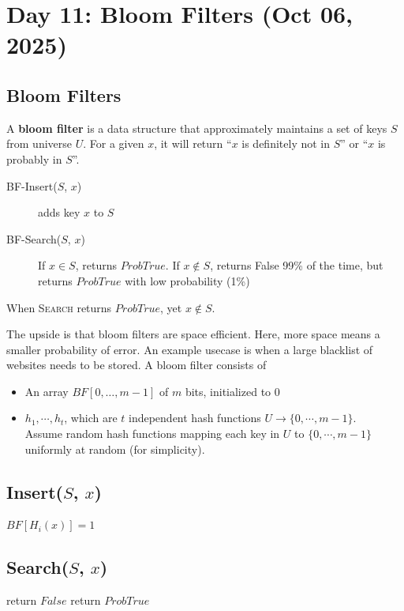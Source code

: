 \section{Day 11: Bloom Filters (Oct 06, 2025)}

\subsection{Bloom Filters}

A \textbf{bloom filter} is a data structure that approximately maintains a set of keys $S$ from universe $U$. For a given $x$, it will return ``$x$ is definitely not in $S$'' or ``$x$ is probably in $S$''.
\begin{description}
    \item[BF-Insert($S$, $x$)] adds key $x$ to $S$
    \item[BF-Search($S$, $x$)] If $x \in S$, returns $ProbTrue$. If $x \not \in S$, returns False 99\% of the time, but returns $ProbTrue$ with low probability (1\%)
\end{description}

\begin{definition}
When \textsc{Search} returns $ProbTrue$, yet $x \not \in S$.
\end{definition}

The upside is that bloom filters are space efficient. Here, more space means a smaller probability of error. An example usecase is when a large blacklist of websites needs to be stored. A bloom filter consists of
\begin{itemize}
    \item An array $BF[0, \dots, m-1]$ of $m$ bits, initialized to 0 
    \item $h_1, \cdots, h_t$, which are $t$ independent hash functions $U \to \{ 0, \cdots, m-1 \}$. \\
    Assume random hash functions mapping each key in $U$ to $\{ 0, \cdots, m-1 \}$ uniformly at random (for simplicity).
\end{itemize}

\subsection*{Insert($S$, $x$)}
\begin{algorithmic}[1]
    \State $BF[H_i(x)] = 1$
\EndFor
\end{algorithmic}

\subsection*{Search($S$, $x$)}
\begin{algorithmic}[1]
        \State return $False$
    \EndIf
\EndFor
\State return $ProbTrue$
\end{algorithmic}

